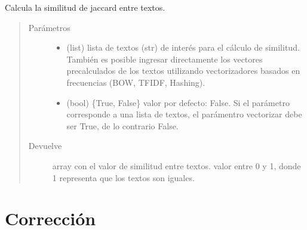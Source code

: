 \documentclass[letterpaper,10pt,openany,spanish]{sphinxmanual}
\begin{document}
\begin{fulllineitems}
\begin{fulllineitems}
\begin{quote}
\begin{description}
\end{description}\end{quote}

\end{fulllineitems}


\begin{fulllineitems}
\label{\detokenize{funciones/comparacion:comparacion.Similitud.jaccard}}
Calcula la similitud de jaccard entre textos.
\begin{quote}\begin{description}
\item[{Parámetros}] \leavevmode\begin{itemize}
\item {} 
 \textendash{} (list) lista de textos (str) de interés para el 
cálculo de similitud. También es posible ingresar directamente 
los vectores pre\sphinxhyphen{}calculados de los textos utilizando 
vectorizadores basados en frecuencias (BOW, TF\sphinxhyphen{}IDF, Hashing).

\item {} 
 \textendash{} (bool) \{True, False\} valor por defecto: False. 
Si el parámetro  corresponde a una lista de textos, 
el parámentro vectorizar debe ser True, de lo contrario False.

\end{itemize}

\item[{Devuelve}] \leavevmode
array con el valor de similitud entre textos. valor entre  
0 y 1, donde 1 representa que los textos son iguales.

\end{description}\end{quote}

\end{fulllineitems}


\end{fulllineitems}



\chapter{Corrección}
\label{\detokenize{funciones/correccion:module-correccion}}\label{\detokenize{funciones/correccion:correccion}}\label{\detokenize{funciones/correccion::doc}}
\end{document}
